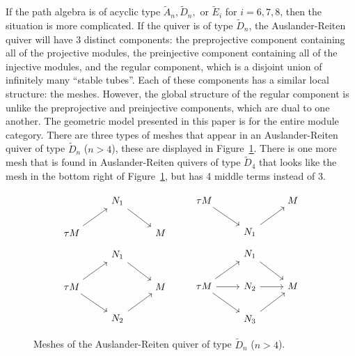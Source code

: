 \documentclass[11pt]{amsart}
\theoremstyle{plain}
\theoremstyle{definition}
\numberwithin{equation}{section}
\begin{document}
If the path algebra is of acyclic type $\widetilde{A}_n, \widetilde{D}_n,$ or $\widetilde{E}_i$ for $i = 6,7,8$, then the situation is more complicated.
If the quiver is of type $\widetilde{D}_n$, the Auslander-Reiten quiver will have 3 distinct components: the preprojective component containing all of the projective modules, the preinjective component containing all of the injective modules, and the regular component, which is a disjoint union of infinitely many ``stable tubes''.
Each of these components has a similar local structure: the meshes.
However, the global structure of the regular component is unlike the preprojective and preinjective components, which are dual to one another. 
The geometric model presented in this paper is for the entire module category. 
There are three types of meshes that appear in an Auslander-Reiten quiver of type $\widetilde{D}_n$ ($n > 4$), these are displayed in Figure~\ref{fig:meshes}. 
There is one more mesh that is found in Auslander-Reiten quivers of type $\widetilde{D}_4$ that looks like the mesh in the bottom right of Figure~\ref{fig:meshes}, but has 4 middle terms instead of 3.

\begin{figure}[h]
    \[\begin{tikzcd}
     & N_1 \arrow{dr} & \\
     \tau M\arrow{ur} &  & M
    \end{tikzcd}\hspace{8mm}
    \begin{tikzcd}
     \tau M\arrow{dr} &  & M \\
     & N_1 \arrow{ur} & 
    \end{tikzcd}\]
    \vspace{8mm}
    \[\begin{tikzcd}
     & N_1 \arrow{dr} & \\
     \tau M\arrow{ur}\arrow{dr} &  & M \\
      & N_2\arrow{ur} &
    \end{tikzcd}\hspace{8mm}
    \begin{tikzcd}
     & N_1 \arrow{dr} & \\
     \tau M\arrow{ur}\arrow{dr}\arrow{r} & N_2\arrow{r} & M \\
      & N_3\arrow{ur} &
    \end{tikzcd}\]  
    \caption{Meshes of the Auslander-Reiten quiver of type $\widetilde{D}_n$ ($n > 4$).}
    \label{fig:meshes}
\end{figure}
\end{document}
